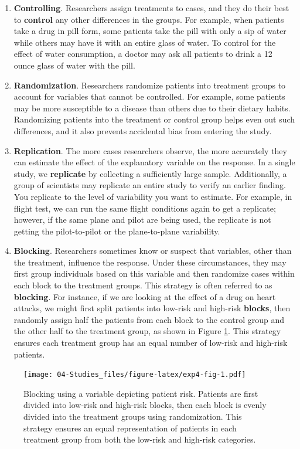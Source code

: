 \documentclass[
]{book}
\begin{document}
\begin{enumerate}
\def\labelenumi{\arabic{enumi}.}
\item
  \textbf{Controlling}. Researchers assign treatments to cases, and they do their best to \textbf{control} any other differences in the groups. For example, when patients take a drug in pill form, some patients take the pill with only a sip of water while others may have it with an entire glass of water. To control for the effect of water consumption, a doctor may ask all patients to drink a 12 ounce glass of water with the pill.
\item
  \textbf{Randomization}. Researchers randomize patients into treatment groups to account for variables that cannot be controlled. For example, some patients may be more susceptible to a disease than others due to their dietary habits. Randomizing patients into the treatment or control group helps even out such differences, and it also prevents accidental bias from entering the study.
\item
  \textbf{Replication}. The more cases researchers observe, the more accurately they can estimate the effect of the explanatory variable on the response. In a single study, we \textbf{replicate} by collecting a sufficiently large sample. Additionally, a group of scientists may replicate an entire study to verify an earlier finding. You replicate to the level of variability you want to estimate. For example, in flight test, we can run the same flight conditions again to get a replicate; however, if the same plane and pilot are being used, the replicate is not getting the pilot-to-pilot or the plane-to-plane variability.
\item
  \textbf{Blocking}. Researchers sometimes know or suspect that variables, other than the treatment, influence the response. Under these circumstances, they may first group individuals based on this variable and then randomize cases within each block to the treatment groups. This strategy is often referred to as \textbf{blocking}. For instance, if we are looking at the effect of a drug on heart attacks, we might first split patients into low-risk and high-risk \textbf{blocks}, then randomly assign half the patients from each block to the control group and the other half to the treatment group, as shown in Figure \ref{fig:exp4-fig}. This strategy ensures each treatment group has an equal number of low-risk and high-risk patients.
\end{enumerate}

\begin{figure}
\centering
\texttt{[image: 04-Studies\_files/figure-latex/exp4-fig-1.pdf]}
\caption{\label{fig:exp4-fig}Blocking using a variable depicting patient risk. Patients are first divided into low-risk and high-risk blocks, then each block is evenly divided into the treatment groups using randomization. This strategy ensures an equal representation of patients in each treatment group from both the low-risk and high-risk categories.}
\end{figure}
\end{document}
